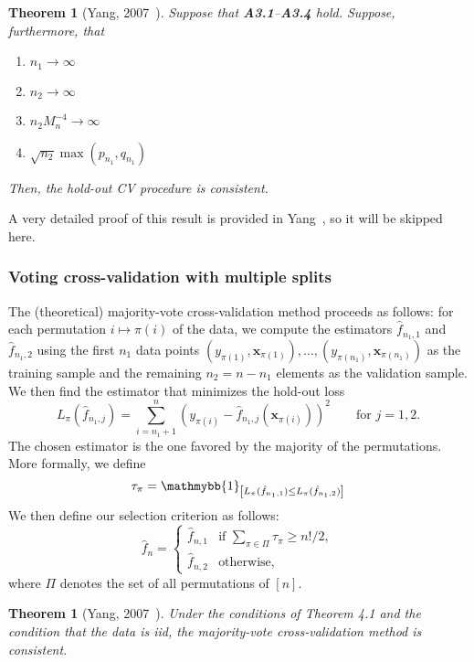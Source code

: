 \documentclass[12pt, letter paper]{article}
\newcommand{\1}{\mathmybb{1}}
\newtheorem{theorem}[proposition]{Theorem}
\newcommand{\0}{\emptyset}
\newcommand{\paren}[1]{\left(#1 \right)}
\newcommand{\sqbr}[1]{\left[#1 \right]}
\newcommand{\ind}[1]{\mathmybb{1}_{\sqbr{#1}}}
\newcommand{\x}{\boldsymbol{x}}
\newcommand{\fhat}[2]{\hat{f}_{#1, #2}}
\begin{document}
\begin{theorem}[Yang, 2007~\cite{yang_2007}]\label{prop:yangth1}
    Suppose that \textbf{A3.1}--\textbf{A3.4} hold. Suppose, furthermore, that
    \begin{enumerate}
        \item \(n_{1}\to\infty\)
        \item \(n_{2}\to\infty\)
        \item \(n_{2}M_{n}^{-4} \to \infty\)
        \item \(\sqrt{n_{2}}\max(p_{n_{1}}, q_{n_{1}})\)
    \end{enumerate}
    Then, the hold-out CV procedure is consistent.
\end{theorem}

A very detailed proof of this result is provided in Yang~\cite{yang_2007}, so it will be skipped here.

\subsubsection{Voting cross-validation with multiple splits}

The (theoretical) majority-vote cross-validation method proceeds as follows: for each permutation \(i\mapsto\pi(i)\) of the data, we compute the estimators \(\fhat{n_{1}}{1}\) and \(\fhat{n_{1}}{2}\) using the first \(n_{1}\) data points \((y_{\pi(1)}, \x_{\pi(1)}), \ldots,(y_{\pi(n_1)}, \x_{\pi(n_1)})\) as the training sample and the remaining \(n_{2}=n-n_{1}\) elements as the validation sample. We then find the estimator that minimizes the hold-out loss
\[L_{\pi}(\fhat{n_{1}}{j}) = \sum_{i=n_{1}+1}^{n}\paren{y_{\pi(i)} - \fhat{n_{1}}{j}\paren{\x_{\pi(i)}}}^{2}\qquad \text{for }j=1,2.\]
The chosen estimator is the one favored by the majority of the permutations. More formally, we define 
\[\tau_{\pi} = \ind{L_{\pi}(\fhat{n_{1}}{1}) \leq L_{\pi}(\fhat{n_{1}}{2})}\]
We then define our selection criterion as follows:
\[\hat{f}_{n} = \begin{cases}
    \fhat{n}{1} &\text{if }\sum_{\pi\in\Pi}\tau_{\pi} \geq {n!}/{2},\\[2mm]
    \fhat{n}{2} &\text{otherwise,}
\end{cases}\]
where \(\Pi\) denotes the set of all permutations of \([n]\).

\begin{theorem}[Yang, 2007~\cite{yang_2007}]\label{prop:yangth2}
    Under the conditions of Theorem 4.1 and the condition that the data is iid, the majority-vote cross-validation method is consistent.
\end{theorem}
\end{document}
